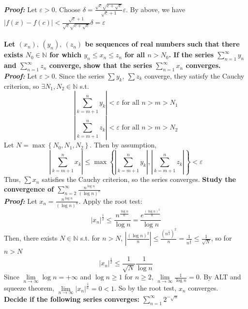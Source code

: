 \documentclass{letter}
\begin{document}
\textit{\textbf{Proof:}} Let $\varepsilon > 0$. Choose $\delta =
\frac{\sqrt{c}\sqrt{c + \sqrt{c}}}{\sqrt{c} + 1}\varepsilon$. By
above, we have $|f(x) - f(c)| < \frac{\sqrt{c} + 1}{\sqrt{c}\sqrt{c +
    \sqrt{c}}}\delta = \varepsilon$ \\ \\
\textbf{Let $(x_n), \ (y_n), \ (z_n)$ be sequences of real numbers such that
there exists $N_0 \in \mathbb{N}$ for which $y_n \leq x_n \leq z_n$
for all $n > N_0$. If the series $\sum\limits_{n = 1}^{\infty} y_n$
and $\sum\limits_{n = 1}^{\infty} z_n$ converge, show that the series
$\sum\limits_{n = 1}^{\infty} x_n$ converges.} \\
\textit{\textbf{Proof:}} Let $\varepsilon > 0$. Since the series $\sum
y_k, \ \sum z_k$ converge, they satisfy the Cauchy criterion, so
$\exists N_1, N_2 \in \mathbb{N}$ s.t.
\[\left|\sum\limits_{k = m + 1}^{n} y_k \right| < \varepsilon \text{ for all } n > m > N_1\] 
\[\left|\sum\limits_{k = m + 1}^{n} z_k \right| < \varepsilon \text{ for all } n > m > N_2\]
Let $N = \max\left\{N_0, N_1, N_2\right\}$. Then by assumption,
\[\left|\sum\limits_{k = m + 1}^{n} x_k \right| \leq \max \left\{
    \left|\sum\limits_{k = m + 1}^{n} y_k \right|,
    \left|\sum\limits_{k = m + 1}^{n} z_k \right| \right\} <
  \varepsilon\]
Thus, $\sum x_n$ satisfies the Cauchy criterion, so the series converges.
\newpage
\textbf{Study the convergence of $\sum\limits_{n = 2}^{\infty}
  \frac{n^{\log n}}{\left(\log n\right)^n}$} \\
\textit{\textbf{Proof:}} Let $x_n = \frac{n^{\log n}}{\left(\log
    n\right)^n}$. Apply the root test:
\[\left| x_n \right|^{\frac{1}{2}} \leq \frac{n^{\frac{\log
        n}{n}}}{\log n} = \frac{e^{\frac{(\log n)^2}{n}}}{\log n}\]
Then, there exists $N \in \mathbb{N}$ s.t. for $n > N$, $\left|
  \frac{(\log n)^2}{n}\right| \leq \frac{\left( n^{\frac{1}{4}}
  \right)^2}{n} = \frac{1}{n^{\frac{1}{2}}} \leq \frac{1}{\sqrt{N}}$,
so for $n > N$
\[\left| x_n \right|^{\frac{1}{2}} \leq \frac{1}{\sqrt{N}} \frac{1}{\log n}\]
Since $\lim\limits_{n \to \infty} \log n = +\infty$ and $\log n \geq
1$ for $n \geq 2$, $\lim\limits_{n \to \infty} \frac{1}{\log n} =
0$. By ALT and squeeze theorem, $\lim\limits_{n \to \infty} \left| x_n
\right|^\frac{1}{n} = 0 < 1$. So by the root test, $x_n$ converges. \\
\textbf{Decide if the following series converges: $\sum\limits_{n =
    1}^{\infty} 2^{-\sqrt{n}}$} \\
\end{document}
